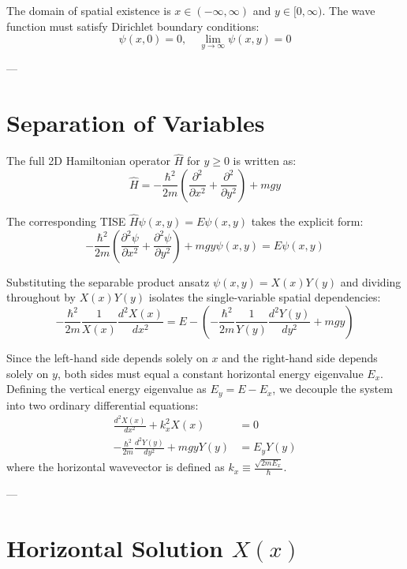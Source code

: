 \documentclass[11pt, a4paper]{article}
\begin{document}
The domain of spatial existence is $x \in (-\infty, \infty)$ and $y \in [0, \infty)$. The wave function must satisfy Dirichlet boundary conditions:
\begin{equation}
\psi(x, 0) = 0, \quad \lim_{y \to \infty} \psi(x, y) = 0
\end{equation}

---

\section{Separation of Variables}

The full 2D Hamiltonian operator $\hat{H}$ for $y \ge 0$ is written as:
\begin{equation}
\hat{H} = -\frac{\hbar^2}{2m} \left( \frac{\partial^2}{\partial x^2} + \frac{\partial^2}{\partial y^2} \right) + mgy
\end{equation}

The corresponding TISE $\hat{H}\psi(x,y) = E\psi(x,y)$ takes the explicit form:
\begin{equation}
-\frac{\hbar^2}{2m} \left( \frac{\partial^2 \psi}{\partial x^2} + \frac{\partial^2 \psi}{\partial y^2} \right) + mgy \psi(x, y) = E \psi(x, y)
\end{equation}

Substituting the separable product ansatz $\psi(x, y) = X(x) Y(y)$ and dividing throughout by $X(x) Y(y)$ isolates the single-variable spatial dependencies:
\begin{equation}
-\frac{\hbar^2}{2m} \frac{1}{X(x)} \frac{d^2 X(x)}{dx^2} = E - \left( -\frac{\hbar^2}{2m} \frac{1}{Y(y)} \frac{d^2 Y(y)}{dy^2} + mgy \right)
\end{equation}

Since the left-hand side depends solely on $x$ and the right-hand side depends solely on $y$, both sides must equal a constant horizontal energy eigenvalue $E_x$. Defining the vertical energy eigenvalue as $E_y = E - E_x$, we decouple the system into two ordinary differential equations:
\begin{align}
\frac{d^2 X(x)}{dx^2} + k_x^2 X(x) &= 0 \label{eq:ODE_x} \\
-\frac{\hbar^2}{2m} \frac{d^2 Y(y)}{dy^2} + mgy Y(y) &= E_y Y(y) \label{eq:ODE_y}
\end{align}
where the horizontal wavevector is defined as $k_x \equiv \frac{\sqrt{2mE_x}}{\hbar}$.

---

\section{Horizontal Solution $X(x)$}
\end{document}
